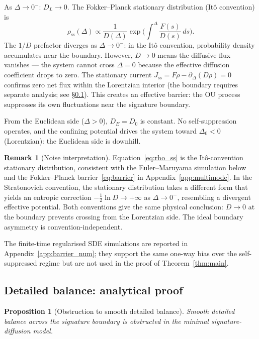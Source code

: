 \documentclass[11pt,a4paper]{article}
\newtheorem{proposition}[theorem]{Proposition}
\theoremstyle{definition}
\newtheorem{remark}{Remark}
\begin{document}
As $\Delta \to 0^-$: $D_L \to 0$. The Fokker--Planck stationary distribution (It\^o convention) is
\begin{equation}
\rho_{\mathrm{ss}}(\Delta) \propto \frac{1}{D(\Delta)}\exp\!\biggl(\int^{\Delta}\frac{F(s)}{D(s)}\,ds\biggr).
\label{eq:rho_ss}
\end{equation}
The $1/D$ prefactor diverges as $\Delta \to 0^-$: in the It\^o convention, probability density accumulates near the boundary. However, $D \to 0$ means the diffusive flux vanishes --- the system cannot cross $\Delta = 0$ because the effective diffusion coefficient drops to zero. The stationary current $J_{\mathrm{ss}} = F\rho - \partial_\Delta(D\rho) = 0$ confirms zero net flux within the Lorentzian interior (the boundary requires separate analysis; see \S\ref{sec:detailed_balance}). This creates an effective barrier: the OU process suppresses its own fluctuations near the signature boundary.

From the Euclidean side ($\Delta > 0$), $D_E = D_0$ is constant. No self-suppression operates, and the confining potential drives the system toward $\Delta_0 < 0$ (Lorentzian): the Euclidean side is downhill.

\begin{remark}[Noise interpretation]
Equation~\eqref{eq:rho_ss} is the It\^o-convention stationary distribution, consistent with the Euler--Maruyama simulation below and the Fokker--Planck barrier~\eqref{eq:barrier} in Appendix~\ref{app:multimode}. In the Stratonovich convention, the stationary distribution takes a different form that yields an entropic correction $-\tfrac{1}{2}\ln D \to +\infty$ as $\Delta \to 0^-$, resembling a divergent effective potential. Both conventions give the same physical conclusion: $D \to 0$ at the boundary prevents crossing from the Lorentzian side. The ideal boundary asymmetry is convention-independent.
\end{remark}

The finite-time regularised SDE simulations are reported in Appendix~\ref{app:barrier_num}; they support the same one-way bias over the self-suppressed regime but are not used in the proof of Theorem~\ref{thm:main}.

\subsection{Detailed balance: analytical proof}\label{sec:detailed_balance}

\begin{proposition}[Obstruction to smooth detailed balance]\label{prop:DB}
Smooth detailed balance across the signature boundary is obstructed in
the minimal signature-diffusion model.
\end{proposition}
\end{document}
